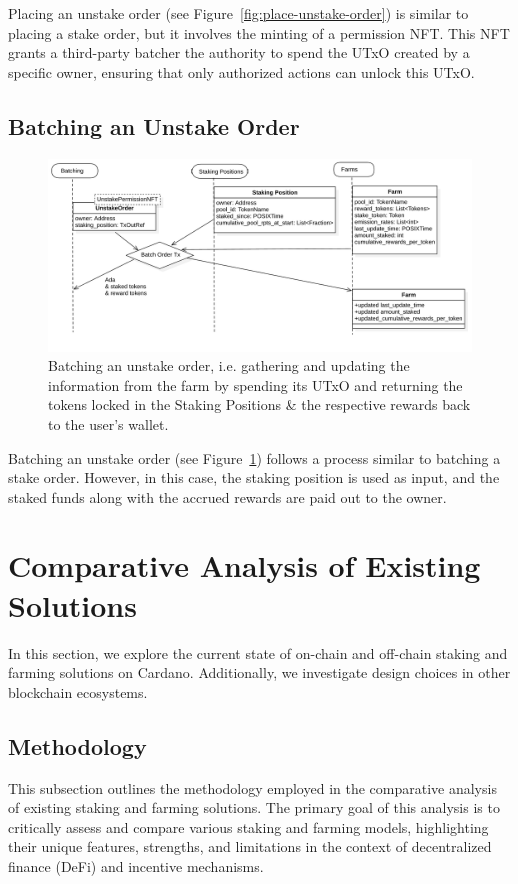 \documentclass[12pt,parskip=full, tikz]{article}
\begin{document}
Placing an unstake order (see Figure~\ref{fig:place-unstake-order}) is similar to placing a stake order, but it involves the minting of a permission NFT. This NFT grants a third-party batcher the authority to spend the UTxO created by a specific owner, ensuring that only authorized actions can unlock this UTxO.

\subsection{Batching an Unstake Order}

\begin{figure}
    \centering
    \includegraphics[width=\textwidth]{figures/batch-unstake-order.png}
    \caption{Batching an unstake order, i.e. gathering and updating the information from the farm by spending its UTxO and returning the tokens locked in the Staking Positions \& the respective rewards back to the user's wallet.}
    \label{fig:batch-unstake-order}
\end{figure}

Batching an unstake order (see Figure~\ref{fig:batch-unstake-order}) follows a process similar to batching a stake order. However, in this case, the staking position is used as input, and the staked funds along with the accrued rewards are paid out to the owner.


\section{Comparative Analysis of Existing Solutions}

In this section, we explore the current state of on-chain and off-chain staking and farming solutions on Cardano. Additionally, we investigate design choices in other blockchain ecosystems.

\subsection{Methodology}
This subsection outlines the methodology employed in the comparative analysis of existing staking and farming solutions. The primary goal of this analysis is to critically assess and compare various staking and farming models, highlighting their unique features, strengths, and limitations in the context of decentralized finance (DeFi) and incentive mechanisms.
\end{document}
